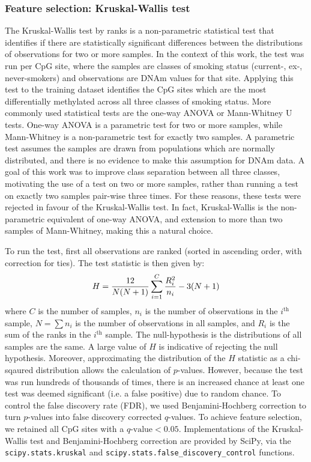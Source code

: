\documentclass{article} %
\newcommand{\equationname}[1]{%
    \begingroup
        \leavevmode
        \addcontentsline{equ}{equations}{\protect\numberline{\theequation}#1}%
    \endgroup   
}
\begin{document}
\subsubsection{Feature selection: Kruskal-Wallis test} \label{sec:feature-selection}
The Kruskal-Wallis test by ranks \cite{Kruskal1952UseOR} is a non-parametric statistical test that identifies if there are statistically significant differences between the distributions of observations for two or more samples. In the context of this work, the test was run per CpG site, where the samples are classes of smoking status (current-, ex-, never-smokers) and observations are DNAm values for that site. Applying this test to the training dataset identifies the CpG sites which are the most differentially methylated across all three classes of smoking status. More commonly used statistical tests are the one-way ANOVA \cite{fisher1921probable} or Mann-Whitney U \cite{mann1947test} tests. One-way ANOVA is a parametric test for two or more samples, while Mann-Whitney is a non-parametric test for exactly two samples. A parametric test assumes the samples are drawn from populations which are normally distributed, and there is no evidence to make this assumption for DNAm data. A goal of this work was to improve class separation between all three classes, motivating the use of a test on two or more samples, rather than running a test on exactly two samples pair-wise three times. For these reasons, these tests were rejected in favour of the Kruskal-Wallis test. In fact, Kruskal-Wallis is the non-parametric equivalent of one-way ANOVA, and extension to more than two samples of Mann-Whitney, making this a natural choice.

To run the test, first all observations are ranked (sorted in ascending order, with correction for ties). The test statistic is then given by:
\begin{equation} \equationname{Kruskal-Wallis test by ranks}
    H = \frac{12}{N(N + 1)}\sum_{i=1}^{C}\frac{R_i^2}{n_i} - 3(N + 1)
\end{equation}
where \(C\) is the number of samples, \(n_i\) is the number of observations in the \(i^\text{th}\) sample, \(N = \sum n_i\) is the number of observations in all samples, and \(R_i\) is the sum of the ranks in the \(i^\text{th}\) sample. The null-hypothesis is the distributions of all samples are the same. A large value of \(H\) is indicative of rejecting the null hypothesis. Moreover, approximating the distribution of the \(H\) statistic as a chi-sqaured distribution allows the calculation of \(p\)-values. However, because the test was run hundreds of thousands of times, there is an increased chance at least one test was deemed significant (i.e. a false positive) due to random chance. To control the false discovery rate (FDR), we used Benjamini-Hochberg correction \cite{benjamini1995controlling} to turn \(p\)-values into false discovery corrected \(q\)-values. To achieve feature selection, we retained all CpG sites with a \(q\text{-value} < 0.05\). Implementations of the Kruskal-Wallis test and Benjamini-Hochberg correction are provided by SciPy, via the \verb|scipy.stats.kruskal| and \verb|scipy.stats.false_discovery_control| functions.
\end{document}
